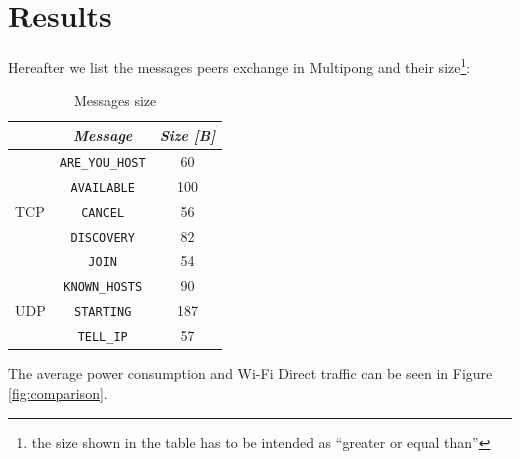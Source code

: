 \section{Results}

Hereafter we list the messages peers exchange in Multipong and their
size\footnote{the size shown in the table has to be intended as ``greater or
equal than''}:

\begin{table}[H]
  \centering
  \begin{tabular}{l|c c}
  & \textbf{\textit{Message}} & \textbf{\textit{Size [B]}}  \tabularnewline
            \hline
            \multirow{5}{*}{TCP} & \multicolumn{1}{c}{\texttt{ARE\_YOU\_HOST}} & \multicolumn{1}{c}{60} \\\cline{2-3}
                                 & \multicolumn{1}{c}{\texttt{AVAILABLE}} & \multicolumn{1}{c}{100} \\\cline{2-3}
                                 & \multicolumn{1}{c}{\texttt{CANCEL}} & \multicolumn{1}{c}{56} \\\cline{2-3}
                                 & \multicolumn{1}{c}{\texttt{DISCOVERY}} & \multicolumn{1}{c}{82} \\\cline{2-3}
                                 & \multicolumn{1}{c}{\texttt{JOIN}} & \multicolumn{1}{c}{54} \\\hline
            \multirow{3}{*}{UDP} & \multicolumn{1}{c}{\texttt{KNOWN\_HOSTS}} & \multicolumn{1}{c}{90} \\\cline{2-3}
                                 & \multicolumn{1}{c}{\texttt{STARTING}} & \multicolumn{1}{c}{187} \\\cline{2-3}
                                 & \multicolumn{1}{c}{\texttt{TELL\_IP}} & \multicolumn{1}{c}{57} \\\hline
        \end{tabular}
  \caption{Messages size}
  \label{tab:sizes}
\end{table}

The average power consumption and Wi-Fi Direct traffic can be seen in Figure
\ref{fig:comparison}.

